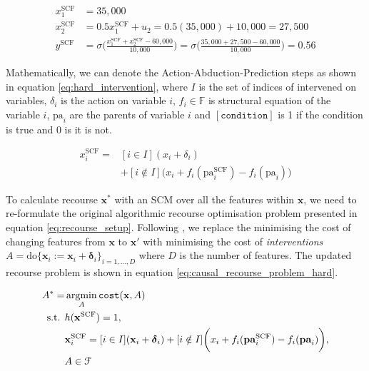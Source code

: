 \begin{align}
	x^{\text{SCF}}_1 & = 35,000 \\ \nonumber
	x^{\text{SCF}}_2 & = 0.5x^{\text{SCF}}_1 + u_2 = 0.5(35,000) + 10,000 = 27,500 \\ \nonumber
	y^{\text{SCF}} & = \sigma \bigg(\frac{x^{\text{SCF}}_1 + x^{\text{SCF}}_2 - 60,000}{10,000} \bigg) = \sigma \bigg(\frac{35,000 + 27,500 - 60,000}{10,000} \bigg) = 0.56 \nonumber
\end{align}

Mathematically, we can denote the Action-Abduction-Prediction steps as shown in equation \ref{eq:hard_intervention}, where $I$ is the set of indices of intervened on variables, $\delta_i$ is the action on variable $i$, $f_i \in \mathbb{F}$ is structural equation of the variable $i$,  $\text{pa}_i$ are the parents of variable $i$ and $[\texttt{condition}]$ is 1 if the condition is true and 0 is it is not. 

\begin{align} \label{eq:hard_intervention}
	x^{\text{SCF}}_i = & [i \in I] (x_i + \delta_i) \\ \nonumber
	& + [i \notin I] \bigg(x_i + f_i(\text{pa}^{\text{SCF}}_i) - f_i(\text{pa}_i)\bigg)
\end{align}


To calculate recourse $\mathbf{x}^*$ with an SCM over all the features within $\mathbf{x}$, we need to re-formulate the original algorithmic recourse optimisation problem presented in equation \ref{eq:recourse_setup}. Following \textcite{karimiAlgorithmicRecourseCounterfactual2021}, we replace the minimising the cost of changing features from $\mathbf{x}$ to $\mathbf{x}'$ with minimising the cost of \textit{interventions} $A = \text{do} \{\mathbf{x}_i:=\mathbf{x}_i + \boldsymbol{\delta}_i\}_{i=1, \ldots, D}$ where $D$ is the number of features. The updated recourse problem is shown in equation \ref{eq:causal_recourse_problem_hard}.

\begin{align} \label{eq:causal_recourse_problem_hard}
	A^* = & \operatorname*{argmin}_{A} \texttt{cost}(\mathbf{x}, A) \\ \nonumber
	\text{s.t. } & h(\mathbf{x}^{\text{SCF}}) = 1, \\ \nonumber
	& \mathbf{x}^{\text{SCF}}_i = [i \in I] (\mathbf{x}_i + \boldsymbol{\delta}_i) + [i \notin I] \bigg(x_i + f_i(\textbf{pa}^{\text{SCF}}_i) - f_i(\textbf{pa}_i)\bigg), \\ \nonumber
	& A \in \mathcal{F}
\end{align}


